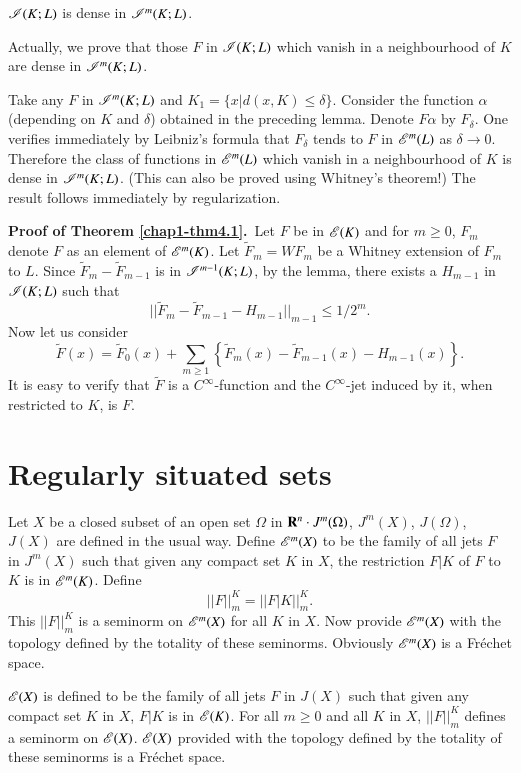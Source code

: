 \begin{lemma}\label{chap1-lem4.3}
$\mathscr{I}(K;L)$ is dense in $\mathscr{I}^{m}(K;L)$.
\end{lemma}

Actually, we prove that those $F$ in $\mathscr{I}(K;L)$ which vanish in a neighbourhood of $K$ are dense in $\mathscr{I}^{m}(K;L)$.

Take any $F$ in $\mathscr{I}^{m}(K;L)$ and $K_{1}=\{x|d(x,K)\leq \delta\}$. Consider the function $\alpha$ (depending on $K$ and $\delta$) obtained in the preceding lemma. Denote $F\alpha$ by $F_{\delta}$. One verifies immediately by Leibniz's formula that $F_{\delta}$ tends to $F$ in $\mathscr{E}^{m}(L)$ as $\delta\to 0$. Therefore the class of functions in $\mathscr{E}^{m}(L)$ which vanish in a neighbourhood of $K$ is dense in $\mathscr{I}^{m}(K;L)$. (This can also be proved using Whitney's theorem!) The result follows immediately by regularization.

\medskip
\noindent
{\bf Proof of Theorem \ref{chap1-thm4.1}.}~Let $F$ be in $\mathscr{E}(K)$ and for $m\geq 0$, $F_{m}$ denote $F$ as an element of $\mathscr{E}^{m}(K)$. Let $\widetilde{F}_{m}=WF_{m}$ be a Whitney extension of $F_{m}$ to $L$. Since $\widetilde{F}_{m}-\widetilde{F}_{m-1}$ is in $\mathscr{I}^{m-1}(K;L)$, by the lemma, there exists a $H_{m-1}$ in $\mathscr{I}(K;L)$ such that
$$
||\widetilde{F}_{m}-\widetilde{F}_{m-1}-H_{m-1}||_{m-1}\leq 1/2^{m}.
$$
Now let us consider
$$
\widetilde{F}(x)=\widetilde{F}_{0}(x)+\sum\limits_{m\geq 1}\left\{\widetilde{F}_{m}(x)-\widetilde{F}_{m-1}(x)-H_{m-1}(x)\right\}.
$$
It is easy to verify that $\widetilde{F}$ is a $C^{\infty}$-function and the $C^{\infty}$-jet induced by it, when restricted to $K$, is $F$.

\section{Regularly situated sets}\label{chap1-sec5}

Let $X$ be a closed subset of an open set $\Omega$ in $\mathbf{R}^{n}\cdot J^{m}(\Omega)$, $J^{m}(X)$, $J(\Omega)$, $J(X)$ are defined in the usual way. Define $\mathscr{E}^{m}(X)$ to be the family of all jets $F$ in $J^{m}(X)$ such that given any compact set $K$ in $X$, the restriction $F|K$ of $F$ to $K$ is in $\mathscr{E}^{m}(K)$. Define
$$
||F||^{K}_{m}=||F|K||^{K}_{m}.
$$
This $||F||^{K}_{m}$ is a seminorm on $\mathscr{E}^{m}(X)$ for all $K$ in $X$. Now provide $\mathscr{E}^{m}(X)$ with the topology defined by the totality of these seminorms. Obviously $\mathscr{E}^{m}(X)$ is a Fr\'echet space.

$\mathscr{E}(X)$ is defined to be the family of all jets $F$ in $J(X)$ such that given any compact set $K$ in $X$, $F|K$ is in $\mathscr{E}(K)$. For all $m\geq 0$ and all $K$ in $X$, $||F||^{K}_{m}$ defines a seminorm on $\mathscr{E}(X)$. $\mathscr{E}(X)$ provided with the topology defined by the totality of these seminorms is a Fr\'echet space.

